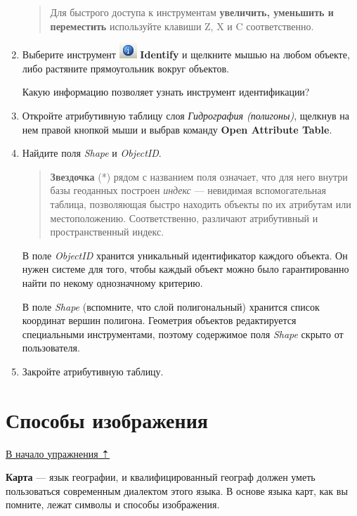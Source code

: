 \documentclass[]{book}
\theoremstyle{definition}
\theoremstyle{definition}
\theoremstyle{definition}
\theoremstyle{remark}
\begin{document}
\begin{enumerate}
  \begin{quote}
  Для быстрого доступа к инструментам \textbf{увеличить, уменьшить и
  переместить} используйте клавиши Z, X и C соответственно.
  \end{quote}
\item
  Выберите инструмент \includegraphics{images/Ex03/image14.png}
  \textbf{Identify} и щелкните мышью на любом объекте, либо растяните
  прямоугольник вокруг объектов.

  Какую информацию позволяет узнать инструмент идентификации?
\item
  Откройте атрибутивную таблицу слоя \emph{Гидрография (полигоны)},
  щелкнув на нем правой кнопкой мыши и выбрав команду \textbf{Open
  Attribute Table}.
\item
  Найдите поля \emph{Shape} и \emph{ObjectID}.

  \begin{quote}
  \textbf{Звездочка} (*) рядом с названием поля означает, что для него
  внутри базы геоданных построен \emph{индекс} --- невидимая
  вспомогательная таблица, позволяющая быстро находить объекты по их
  атрибутам или местоположению. Соответственно, различают атрибутивный и
  пространственный индекс.
  \end{quote}

  В поле \emph{ObjectID} хранится уникальный идентификатор каждого
  объекта. Он нужен системе для того, чтобы каждый объект можно было
  гарантированно найти по некому однозначному критерию.

  В поле \emph{Shape} (вспомните, что слой полигональный) хранится
  список координат вершин полигона. Геометрия объектов редактируется
  специальными инструментами, поэтому содержимое поля \emph{Shape}
  скрыто от пользователя.
\item
  Закройте атрибутивную таблицу.
\end{enumerate}

\hypertarget{map-design-quaternary-representations}{%
\section{Способы
изображения}\label{map-design-quaternary-representations}}

\protect\hyperlink{map-design-quaternary}{В начало упражнения ⇡}

\textbf{Карта} --- язык географии, и квалифицированный географ должен
уметь пользоваться современным диалектом этого языка. В основе языка
карт, как вы помните, лежат символы и способы изображения.
\end{document}
